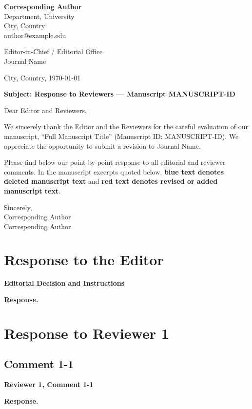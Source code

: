 \documentclass[
  paper=a4,
  fontsize=11pt,
  DIV=12,
  BCOR=0mm,
  parskip=half,       %
  numbers=noenddot,
  headings=normal
]{scrartcl}
\makeatletter
\newenvironment{reviewercomment}[1]{%
  \par\medskip
  \noindent\colorbox{commentgray}{\parbox{0.96\linewidth}{\textbf{#1}}}%
  \par\smallskip\noindent
}{\par\medskip}
\newenvironment{response}{%
  \noindent\colorbox{replygray}{\parbox{0.96\linewidth}{\textbf{Response.}}}%
  \par\smallskip\noindent
}{\par\medskip}
\newcommand{\papertitle}{Full Manuscript Title}
\newcommand{\journalname}{Journal Name}
\newcommand{\manuscriptid}{MANUSCRIPT-ID}
\newcommand{\revisiondate}{\today}
\newcommand{\correspondingauthor}{Corresponding Author}
\newcommand{\correspondingemail}{author@example.edu}
\newcommand{\senderblock}{%
  \begin{minipage}[t]{0.43\textwidth}\raggedleft
    \textbf{\correspondingauthor}\\
    Department, University\\
    City, Country\\[0.35em]
    \correspondingemail
  \end{minipage}%
}
\newcommand{\recipientblock}{%
  \begin{minipage}[t]{0.43\textwidth}
    Editor-in-Chief / Editorial Office\\
    \journalname
  \end{minipage}%
}
\makeatother
\begin{document}
\thispagestyle{empty}

\noindent\begin{minipage}[t]{0.54\textwidth}\vspace{0pt}\end{minipage}%
\hfill\senderblock

\vspace{2.6em}
\noindent\recipientblock

\vspace{1.3em}
\noindent City, Country, \revisiondate

\vspace{1.2em}
\noindent\textbf{Subject: Response to Reviewers --- Manuscript \manuscriptid}

\vspace{0.8em}
\noindent Dear Editor and Reviewers,

\medskip
We sincerely thank the Editor and the Reviewers for the careful evaluation of
our manuscript, ``\papertitle'' (Manuscript ID: \manuscriptid). We appreciate
the opportunity to submit a revision to \journalname.

Please find below our point-by-point response to all editorial and reviewer
comments. In the manuscript excerpts quoted below,
\textcolor{deletedblue}{\textbf{blue text denotes deleted manuscript text}} and
\textcolor{addedred}{\textbf{red text denotes revised or added manuscript text}}.

\vspace{1.2em}
\noindent Sincerely,\\[1.2em]
\noindent\correspondingauthor\\
\noindent Corresponding Author

\clearpage
\pagestyle{plain}

\section*{Response to the Editor}
\begin{reviewercomment}{Editorial Decision and Instructions}
\end{reviewercomment}
\begin{response}
\end{response}

\section*{Response to Reviewer 1}
\subsection*{Comment 1-1}
\begin{reviewercomment}{Reviewer 1, Comment 1-1}
\end{reviewercomment}
\begin{response}
\end{response}

\end{document}
